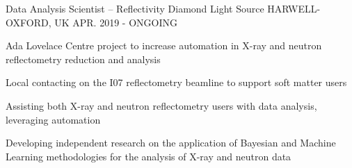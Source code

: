 \begin{cventries}
  \cventry
    {Data Analysis Scientist -- Reflectivity}
    {Diamond Light Source}
    {HARWELL-OXFORD, UK}
    {APR. 2019 - ONGOING}
    {
      \begin{cvitems}
        \item {Ada Lovelace Centre project to increase automation in X-ray and neutron reflectometry reduction and analysis}
        \item {Local contacting on the I07 reflectometry beamline to support soft matter users}
        \item {Assisting both X-ray and neutron reflectometry users with data analysis, leveraging automation}
        \item {Developing independent research on the application of Bayesian and Machine Learning methodologies for the analysis of X-ray and neutron data}
      \end{cvitems}
    }
\end{cventries}

